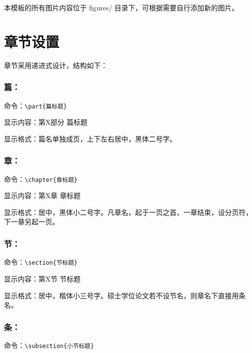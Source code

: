 本模板的所有图片内容位于 figures/ 目录下，可根据需要自行添加新的图片。

\section{章节设置}

章节采用递进式设计，结构如下：

\subsubsection{篇：}

命令：\verb|\part{篇标题}|

显示内容：第X部分 篇标题

显示格式：篇名单独成页，上下左右居中，黑体二号字。

\subsubsection{章：}

命令：\verb|\chapter{章标题}|

显示内容：第X章 章标题

显示格式：居中，黑体小二号字。凡章名，起于一页之首，一章结束，设分页符，下一章另起一页。

\subsubsection{节：}

命令：\verb|\section{节标题}|

显示内容：第X节 节标题

显示格式：居中，楷体小三号字。硕士学位论文若不设节名，则章名下直接用条名。

\subsubsection{条：}

命令：\verb|\subsection{小节标题}|

